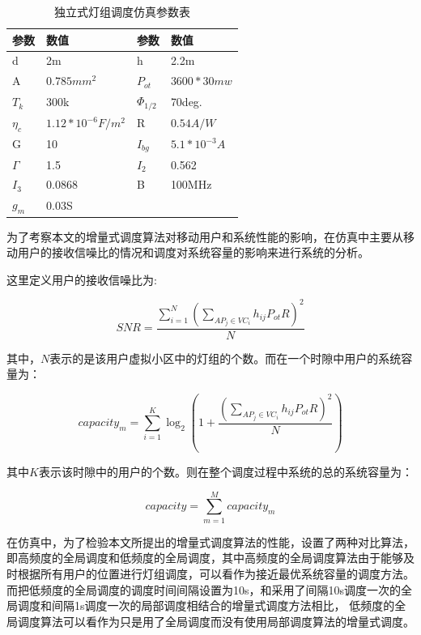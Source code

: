 \begin{table}[htbp]
    \caption{独立式灯组调度仿真参数表}
    \label{tab:iss-simulation-param}
    \centering
    \begin{tabular}{llll}
        \toprule
        参数     & 数值 & 参数 & 数值 \\
        \midrule
        d        & 2m                & h           & 2.2m \\
        A        & $0.785mm^{2}$       & $P_{ot}$      & $3600*30mw$ \\
        $T_{k}$    & 300k              & $\Phi_{1/2}$  & 70deg. \\
        $\eta_{c}$ & $1.12*10^{-6}F/m^2$ & R           & $0.54A/W$\\
        G        & 10                & $I_{bg}$      & $5.1*10^{-3}A$ \\
        $\Gamma$   & 1.5               & $I_{2}$       & 0.562 \\
        $I_{3}$    & 0.0868            & B           & 100MHz \\
        $g_m$      & 0.03S \\
        \bottomrule
    \end{tabular}
\end{table}

为了考察本文的增量式调度算法对移动用户和系统性能的影响，在仿真中主要从移动用户的接收信噪比的情况和调度对系统容量的影响来进行系统的分析。

这里定义用户的接收信噪比为:

\begin{equation}
    SNR = \frac{{\sum\limits_{i = 1}^N {{{(\sum\limits_{A{P_j} \in V{C_i}} {{h_{ij}}{P_{ot}}R} )}^2}} }}{N}
\end{equation}

其中，$N$表示的是该用户虚拟小区中的灯组的个数。而在一个时隙中用户的系统容量为：

\begin{equation}
    capacit{y_m} = \sum\limits_{i = 1}^K {{{\log }_2}(1 + \frac{{{{(\sum\limits_{A{P_j} \in V{C_i}} {{h_{ij}}{P_{ot}}R} )}^2}}}{N})}
\end{equation}

其中$K$表示该时隙中的用户的个数。则在整个调度过程中系统的总的系统容量为：

\begin{equation}
    capacity = \sum\limits_{m = 1}^M {capacit{y_m}}
\end{equation}

在仿真中，为了检验本文所提出的增量式调度算法的性能，设置了两种对比算法，即高频度的全局调度和低频度的全局调度，其中高频度的全局调度算法由于能够及时根据所有用户的位置进行灯组调度，可以看作为接近最优系统容量的调度方法。而把低频度的全局调度的调度时间间隔设置为10s，和采用了间隔10s调度一次的全局调度和间隔1s调度一次的局部调度相结合的增量式调度方法相比，
低频度的全局调度算法可以看作为只是用了全局调度而没有使用局部调度算法的增量式调度。

